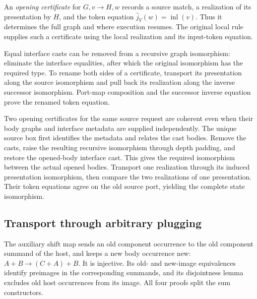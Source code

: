 An \emph{opening certificate} for $G,v\longrightarrow H,w$ records a source
match, a realization of its presentation by $H$, and the token equation
$\widehat j_V(w)=\operatorname{inl}(v)$. Thus it determines the full graph and
where execution resumes. The original local rule supplies such a certificate
using the local realization and its input-token equation.



Equal interface casts can be removed from a recursive graph isomorphism:
eliminate the interface equalities, after which the original isomorphism has
the required type. To rename both sides of a certificate, transport its
presentation along the source isomorphism and pull back its realization along
the inverse successor isomorphism. Port-map composition and the successor
inverse equation prove the renamed token equation.



Two opening certificates for the same source request are coherent even when
their body graphs and interface metadata are supplied independently. The
unique source box first identifies the metadata and relates the cast bodies.
Remove the casts, raise the resulting recursive isomorphism through depth
padding, and restore the opened-body interface cast. This gives the required
isomorphism between the actual opened bodies. Transport one realization
through its induced presentation isomorphism, then compare the two
realizations of one presentation. Their token equations agree on the old
source port, yielding the complete state isomorphism.


\subsection{Transport through arbitrary plugging}

The auxiliary shift map sends an old component occurrence to the old
component summand of the host, and keeps a new body occurrence new:
$A+B\to(C+A)+B$. It is injective. Its old- and new-image equivalences identify
preimages in the corresponding summands, and its disjointness lemma excludes
old host occurrences from its image. All four proofs split the sum constructors.

